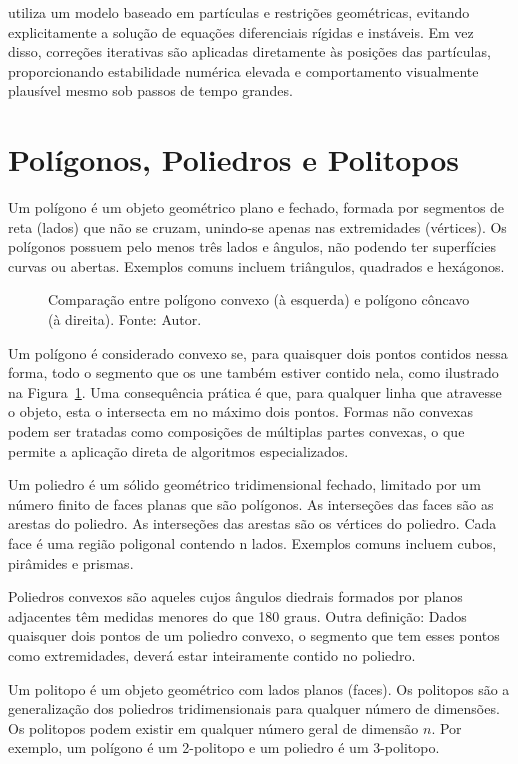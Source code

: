  utiliza um modelo baseado em partículas e restrições geométricas, evitando explicitamente a solução de equações diferenciais rígidas e instáveis. Em vez disso, correções iterativas são aplicadas diretamente às posições das partículas, proporcionando estabilidade numérica elevada e comportamento visualmente plausível mesmo sob passos de tempo grandes.

\section{Polígonos, Poliedros e Politopos}

Um polígono é um objeto geométrico plano e fechado, formada por segmentos de reta (lados) que não se cruzam, unindo-se apenas nas extremidades (vértices). Os polígonos possuem pelo menos três lados e ângulos, não podendo ter superfícies curvas ou abertas. Exemplos comuns incluem triângulos, quadrados e hexágonos.

\begin{figure}[htb]
	\centering
	
	\caption{Comparação entre polígono convexo (à esquerda) e polígono côncavo (à direita). Fonte: Autor.}
	\label{fig:poligonos}
\end{figure}

Um polígono é considerado convexo se, para quaisquer dois pontos contidos nessa forma, todo o segmento que os une também estiver contido nela, como ilustrado na Figura~\ref{fig:poligonos}. Uma consequência prática é que, para qualquer linha que atravesse o objeto, esta o intersecta em no máximo dois pontos. Formas não convexas podem ser tratadas como composições de múltiplas partes convexas, o que permite a aplicação direta de algoritmos especializados.

Um poliedro é um sólido geométrico tridimensional fechado, limitado por um número finito de faces planas que são polígonos. As interseções das faces são as arestas do poliedro. As interseções das arestas são os vértices do poliedro. Cada face é uma região poligonal contendo n lados. Exemplos comuns incluem cubos, pirâmides e prismas.

Poliedros convexos são aqueles cujos ângulos diedrais formados por planos adjacentes têm medidas menores do que 180 graus. Outra definição: Dados quaisquer dois pontos de um poliedro convexo, o segmento que tem esses pontos como extremidades, deverá estar inteiramente contido no poliedro.

Um politopo é um objeto geométrico com lados planos (faces). Os politopos são a generalização dos poliedros tridimensionais para qualquer número de dimensões. Os politopos podem existir em qualquer número geral de dimensão $n$. Por exemplo, um polígono é um 2-politopo e um poliedro é um 3-politopo.